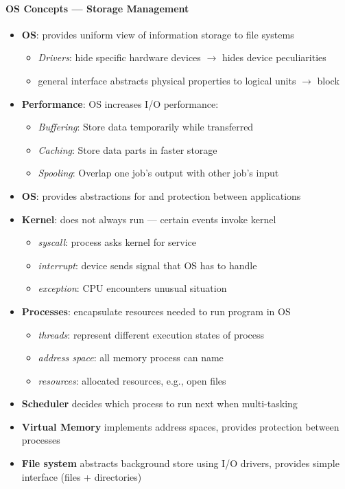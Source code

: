 \paragraph{OS Concepts --- Storage Management}
\begin{itemize}
	\item \textbf{OS}: provides uniform view of information storage to file systems
	\begin{itemize}
		\item \emph{Drivers}: hide specific hardware devices $ \to $ hides device peculiarities
		\item general interface abstracts physical properties to logical units $ \to $ block
	\end{itemize}
	\item \textbf{Performance}: OS increases I/O performance:
	\begin{itemize}
		\item \emph{Buffering}: Store data temporarily while transferred
		\item \emph{Caching}: Store data parts in faster storage
		\item \emph{Spooling}: Overlap one job's output with other job's input
	\end{itemize}
\end{itemize}

\begin{summary}
	\begin{itemize}
		\item \textbf{OS}: provides abstractions for and protection between applications
		\item \textbf{Kernel}: does not always run --- certain events invoke kernel
		\begin{itemize}
			\item \emph{syscall}: process asks kernel for service
			\item \emph{interrupt}: device sends signal that OS has to handle
			\item \emph{exception}: CPU encounters unusual situation
		\end{itemize}
		\item \textbf{Processes}: encapsulate resources needed to run program in OS
		\begin{itemize}
			\item \emph{threads}: represent different execution states of process
			\item \emph{address space}: all memory process can name
			\item \emph{resources}: allocated resources, e.g., open files
		\end{itemize}
		\item \textbf{Scheduler} decides which process to run next when multi-tasking
		\item \textbf{Virtual Memory} implements address spaces, provides protection between processes
		\item \textbf{File system} abstracts background store using I/O drivers, provides simple interface (files + directories)
	\end{itemize}
\end{summary}